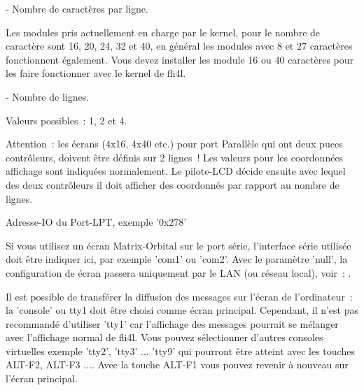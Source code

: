 \begin{description}
   - Nombre de caractères par ligne.

  Les modules pris actuellement en charge par le kernel, pour le nombre de
  caractère sont 16, 20, 24, 32 et 40, en général les modules avec 8 et 27
  caractères fonctionnent également. Vous devez installer les module 16 ou 40
  caractères pour les faire fonctionner avec le kernel de fli4l.

 - Nombre de lignes.

    Valeurs possibles~: 1, 2 et 4.

    Attention~: les écrans (4x16, 4x40 etc.) pour port Parallèle qui ont
    deux puces contrôleurs, doivent être définis sur 2 lignes~! Les valeurs
    pour les coordonnées affichage sont indiquées normalement. Le pilote-LCD
    décide ensuite avec lequel des deux contrôleurs il doit afficher des
    coordonnés par rapport au nombre de lignes.


      Adresse-IO du Port-LPT, exemple '0x278'

      Si vous utilisez un écran Matrix-Orbital sur le port série, l'interface
      série utilisée doit être indiquer ici, par exemple 'com1' ou 'com2'. Avec
      le paramètre 'null', la configuration de écran passera uniquement par le
      LAN (ou réseau local), voir~: .

      Il est possible de transférer la diffusion des messages sur l'écran de
      l'ordinateur~: la 'console' ou tty1 doit être choisi comme écran principal.
      Cependant, il n'est pas recommandé d'utiliser 'tty1' car l'affichage des
      messages pourrait se mélanger avec l'affichage normal de fli4l. Vous pouvez
      sélectionner d'autres consoles virtuelles exemple 'tty2', 'tty3' ... 'tty9'
      qui pourront être atteint avec les touches ALT-F2, ALT-F3 .... Avec la touche
      ALT-F1 vous pouvez revenir à nouveau sur l'écran principal.



\end{description}
